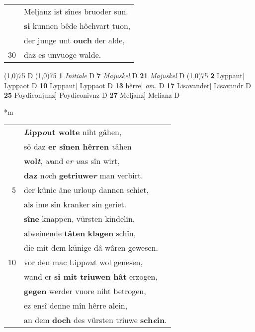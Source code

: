 \documentclass[8pt,a4paper,notitlepage]{article}
\begin{document}
\begin{table}[ht]
\begin{minipage}[t]{0.5\linewidth}
\begin{tabular}{rl}
 & Meljanz ist sînes bruoder sun.\\ 
 & \textbf{si} kunnen bêde hôchvart tuon,\\ 
 & der junge unt \textbf{ouch} der alde,\\ 
30 & daz es unvuoge walde.\\ 
\end{tabular}
\scriptsize
\line(1,0){75} \newline
D \newline
\line(1,0){75} \newline
\textbf{1} \textit{Initiale} D  \textbf{7} \textit{Majuskel} D  \textbf{21} \textit{Majuskel} D  \newline
\line(1,0){75} \newline
\textbf{2} Lyppaut] Lyppaot D \textbf{10} Lyppaut] Lyppaot D \textbf{13} hêrre] \textit{om.} D \textbf{17} Lisavander] Lisavandr D \textbf{25} Poydiconjunz] Poydiconivnz D \textbf{27} Meljanz] Melianz D \newline
\end{minipage}
\hspace{0.5cm}
\begin{minipage}[t]{0.5\linewidth}
\small
\begin{center}*m
\end{center}
\begin{tabular}{rl}
 & \textbf{\textit{L}ipp\textit{o}ut wolte} niht gâhen,\\ 
 & sô daz \textbf{er sînen hêrren} \textit{v}âhen\\ 
 & \textbf{wol\textit{t}}, \textit{w}and e\textit{r w}as sîn wirt,\\ 
 & \textbf{daz} n\textit{o}ch \textbf{getriuwe\textit{r}} man verbirt.\\ 
5 & der künic âne urloup dannen schiet,\\ 
 & als ime sîn kranker sin geriet.\\ 
 & \textbf{sîne} knappen, vürsten kindelîn,\\ 
 & alweinende \textbf{tâten} \textbf{klagen} schîn,\\ 
 & die mit dem künige dâ wâren gewesen.\\ 
10 & vor den mac Lipp\textit{ou}t wol genesen,\\ 
 & wand er \textbf{si mit triuwen hât} erzogen,\\ 
 & \textbf{gegen} werder vuore niht betrogen,\\ 
 & ez ensî denne mîn hêrre alein,\\ 
 & an dem \textbf{doch} des vürsten triuwe \textbf{sch\textit{e}in}.\\ 

\end{tabular}
\end{minipage}
\end{table}
\end{document}
